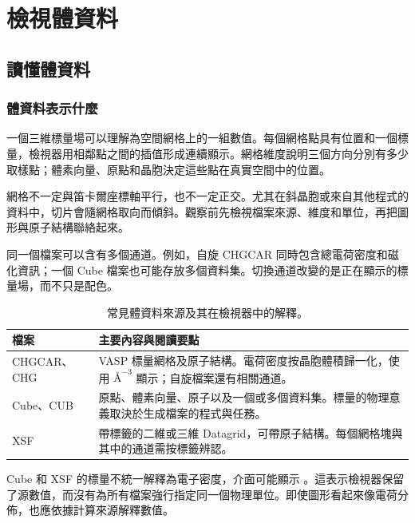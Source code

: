 \chapter{檢視體資料}\label{ch:volume}


\section{讀懂體資料}

\subsection{體資料表示什麼}

一個三維標量場可以理解為空間網格上的一組數值。每個網格點具有位置和一個標量，檢視器用相鄰點之間的插值形成連續顯示。網格維度說明三個方向分別有多少取樣點；體素向量、原點和晶胞決定這些點在真實空間中的位置。

網格不一定與笛卡爾座標軸平行，也不一定正交。尤其在斜晶胞或來自其他程式的資料中，切片會隨網格取向而傾斜。觀察前先檢視檔案來源、維度和單位，再把圖形與原子結構聯絡起來。

同一個檔案可以含有多個通道。例如，自旋 CHGCAR 同時包含總電荷密度和磁化資訊；一個 Cube 檔案也可能存放多個資料集。切換通道改變的是正在顯示的標量場，而不只是配色。

\begin{table}[htbp]
\centering
\caption{常見體資料來源及其在檢視器中的解釋。}
\begin{tabularx}{\linewidth}{lX}
\toprule
檔案 & 主要內容與閱讀要點 \\
\midrule
CHGCAR、CHG & VASP 標量網格及原子結構。電荷密度按晶胞體積歸一化，使用 $\text{\AA}^{-3}$ 顯示；自旋檔案還有相關通道。\\
Cube、CUB & 原點、體素向量、原子以及一個或多個資料集。標量的物理意義取決於生成檔案的程式與任務。\\
XSF & 帶標籤的二維或三維 Datagrid，可帶原子結構。每個網格塊與其中的通道需按標籤辨認。\\
\bottomrule
\end{tabularx}
\end{table}

Cube 和 XSF 的標量不統一解釋為電子密度，介面可能顯示 。這表示檢視器保留了源數值，而沒有為所有檔案強行指定同一個物理單位。即使圖形看起來像電荷分佈，也應依據計算來源解釋數值。

